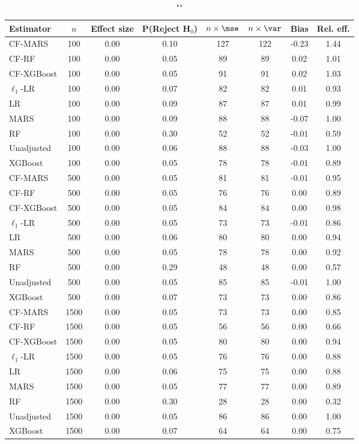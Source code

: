 \begin{table}
\centering
\caption{""}
\begin{tabular}{lccccccc}
\toprule
Estimator & $n$ & Effect size & P(Reject H$_0$) & $n\times\mse$ & $n\times \var$ & Bias & Rel. eff.\\ \midrule
CF-MARS & 100 & 0.00 & 0.10 & 127 & 122 & -0.23 & 1.44 \\ 
CF-RF & 100 & 0.00 & 0.05 &  89 &  89 &  0.02 & 1.01 \\ 
CF-XGBoost & 100 & 0.00 & 0.05 &  91 &  91 &  0.02 & 1.03 \\ 
$\ell_1$-LR & 100 & 0.00 & 0.07 &  82 &  82 &  0.01 & 0.93 \\ 
LR & 100 & 0.00 & 0.09 &  87 &  87 &  0.01 & 0.99 \\ 
MARS & 100 & 0.00 & 0.09 &  88 &  88 & -0.07 & 1.00 \\ 
RF & 100 & 0.00 & 0.30 &  52 &  52 & -0.01 & 0.59 \\ 
Unadjusted & 100 & 0.00 & 0.06 &  88 &  88 & -0.03 & 1.00 \\ 
XGBoost & 100 & 0.00 & 0.05 &  78 &  78 & -0.01 & 0.89 \\ \addlinespace 
CF-MARS & 500 & 0.00 & 0.05 &  81 &  81 & -0.01 & 0.95 \\ 
CF-RF & 500 & 0.00 & 0.05 &  76 &  76 &  0.00 & 0.89 \\ 
CF-XGBoost & 500 & 0.00 & 0.05 &  84 &  84 &  0.00 & 0.98 \\ 
$\ell_1$-LR & 500 & 0.00 & 0.05 &  73 &  73 & -0.01 & 0.86 \\ 
LR & 500 & 0.00 & 0.06 &  80 &  80 &  0.00 & 0.94 \\ 
MARS & 500 & 0.00 & 0.05 &  78 &  78 &  0.00 & 0.92 \\ 
RF & 500 & 0.00 & 0.29 &  48 &  48 &  0.00 & 0.57 \\ 
Unadjusted & 500 & 0.00 & 0.05 &  85 &  85 & -0.01 & 1.00 \\ 
XGBoost & 500 & 0.00 & 0.07 &  73 &  73 &  0.00 & 0.86 \\ \addlinespace 
CF-MARS & 1500 & 0.00 & 0.05 &  73 &  73 &  0.00 & 0.85 \\ 
CF-RF & 1500 & 0.00 & 0.05 &  56 &  56 &  0.00 & 0.66 \\ 
CF-XGBoost & 1500 & 0.00 & 0.05 &  80 &  80 &  0.00 & 0.94 \\ 
$\ell_1$-LR & 1500 & 0.00 & 0.05 &  76 &  76 &  0.00 & 0.88 \\ 
LR & 1500 & 0.00 & 0.06 &  75 &  75 &  0.00 & 0.88 \\ 
MARS & 1500 & 0.00 & 0.05 &  77 &  77 &  0.00 & 0.89 \\ 
RF & 1500 & 0.00 & 0.30 &  28 &  28 &  0.00 & 0.32 \\ 
Unadjusted & 1500 & 0.00 & 0.05 &  86 &  86 &  0.00 & 1.00 \\ 
XGBoost & 1500 & 0.00 & 0.07 &  64 &  64 &  0.00 & 0.75 \\
\bottomrule
\end{tabular}
\end{table}

